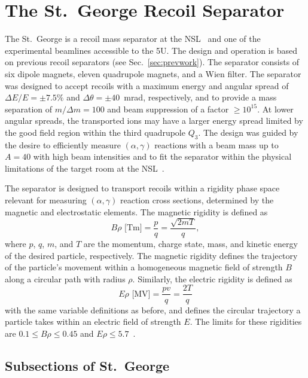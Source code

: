 \section{The St.\ George Recoil Separator}
\label{sec:stg}

The St.\ George is a
recoil mass separator at the NSL~\cite{Couder2008} and one of the experimental
beamlines accessible to the 5U. The design and operation is based on
previous recoil separators (see Sec.~\ref{sec:prevwork}). The separator
consists of six dipole magnets, eleven quadrupole magnets, and a Wien filter.
The separator was designed to accept recoils with a maximum energy and angular
spread of $\Delta E/E = \pm7.5\%$ and $\Delta\theta = \pm40$~mrad,
respectively, and to provide a mass separation of $m/\Delta m = 100$ and
beam suppression of a factor $\geq 10^{15}$. At lower angular spreads, the
transported ions may have a larger energy spread limited by the good field
region within the third quadrupole $Q_3$. The design was guided by the desire
to efficiently measure $(\alpha,\gamma)$ reactions with a beam mass up to
$A = 40$ with high beam intensities and to fit the separator within the
physical limitations of the target room at the NSL~\cite{Couder2008}.

The separator is designed to transport recoils within a rigidity phase space
relevant for measuring $(\alpha,\gamma)$ reaction cross sections, determined by
the magnetic and electrostatic elements. The magnetic rigidity is defined as
\begin{equation}
    \label{eq:brho}
    B\rho\textrm{ [Tm]} = \frac{p}{q} = \frac{\sqrt{2mT}}{q},
\end{equation}
where $p$, $q$, $m$, and $T$ are the momentum, charge state, mass, and kinetic
energy of the desired particle, respectively. The magnetic rigidity
defines the trajectory of the particle's movement within a homogeneous magnetic
field of strength $B$ along a circular path with radius $\rho$. Similarly, the
electric rigidity is defined as
\begin{equation}
    \label{eq:erho}
    E\rho\textrm{ [MV]} = \frac{pv}{q} = \frac{2T}{q}
\end{equation}
with the same variable definitions as before, and defines the circular
trajectory a particle takes within an electric field of strength $E$. The
limits for these rigidities are $0.1 \leq B\rho \leq 0.45$ and
$E\rho \leq 5.7$~\cite{Couder2008}.


\subsection{Subsections of St.\ George}

